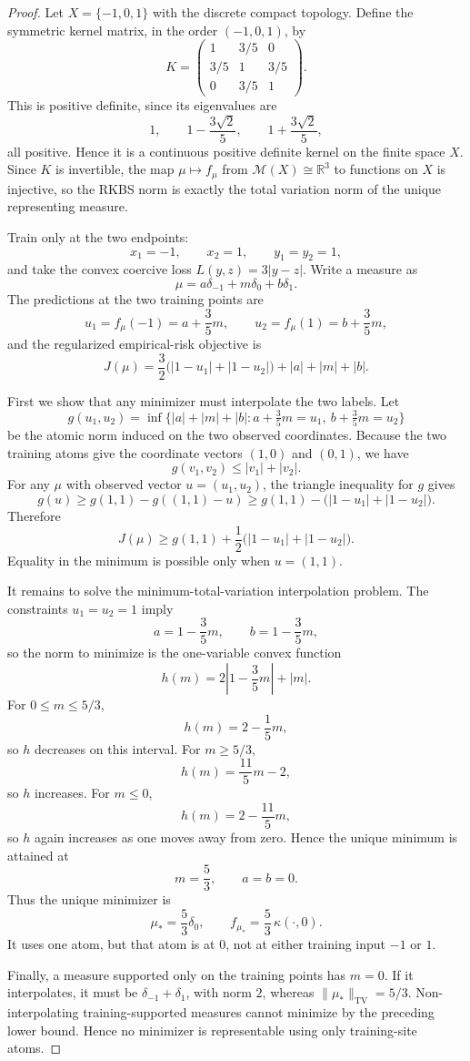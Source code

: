 \documentclass[11pt]{article}
\begin{document}
\begin{proof}
Let \(X=\{-1,0,1\}\) with the discrete compact topology.  Define the symmetric
kernel matrix, in the order \((-1,0,1)\), by
\[
K=
\begin{pmatrix}
1&3/5&0\\
3/5&1&3/5\\
0&3/5&1
\end{pmatrix}.
\]
This is positive definite, since its eigenvalues are
\[
1,\qquad 1-\frac{3\sqrt2}{5},\qquad 1+\frac{3\sqrt2}{5},
\]
all positive.  Hence it is a continuous positive definite kernel on the finite
space \(X\).  Since \(K\) is invertible, the map
\(\mu\mapsto f_\mu\) from \(\mathcal M(X)\cong\mathbb R^3\) to functions on
\(X\) is injective, so the RKBS norm is exactly the total variation norm of
the unique representing measure.

Train only at the two endpoints:
\[
x_1=-1,\qquad x_2=1,\qquad y_1=y_2=1,
\]
and take the convex coercive loss \(L(y,z)=3|y-z|\).  Write a measure as
\[
\mu=a\delta_{-1}+m\delta_0+b\delta_1.
\]
The predictions at the two training points are
\[
u_1=f_\mu(-1)=a+\frac35m,\qquad
u_2=f_\mu(1)=b+\frac35m,
\]
and the regularized empirical-risk objective is
\[
J(\mu)=\frac32\bigl(|1-u_1|+|1-u_2|\bigr)+|a|+|m|+|b|.
\]

First we show that any minimizer must interpolate the two labels.  Let
\[
g(u_1,u_2)=\inf\{|a|+|m|+|b|:
a+\tfrac35m=u_1,\ b+\tfrac35m=u_2\}
\]
be the atomic norm induced on the two observed coordinates.  Because the two
training atoms give the coordinate vectors \((1,0)\) and \((0,1)\), we have
\[
g(v_1,v_2)\le |v_1|+|v_2|.
\]
For any \(\mu\) with observed vector \(u=(u_1,u_2)\), the triangle inequality
for \(g\) gives
\[
g(u)\ge g(1,1)-g((1,1)-u)
\ge g(1,1)-\bigl(|1-u_1|+|1-u_2|\bigr).
\]
Therefore
\[
J(\mu)
\ge g(1,1)+\frac12\bigl(|1-u_1|+|1-u_2|\bigr).
\]
Equality in the minimum is possible only when \(u=(1,1)\).

It remains to solve the minimum-total-variation interpolation problem.  The
constraints \(u_1=u_2=1\) imply
\[
a=1-\frac35m,\qquad b=1-\frac35m,
\]
so the norm to minimize is the one-variable convex function
\[
h(m)=2\left|1-\frac35m\right|+|m|.
\]
For \(0\le m\le 5/3\),
\[
h(m)=2-\frac15m,
\]
so \(h\) decreases on this interval.  For \(m\ge 5/3\),
\[
h(m)=\frac{11}{5}m-2,
\]
so \(h\) increases.  For \(m\le0\),
\[
h(m)=2-\frac{11}{5}m,
\]
so \(h\) again increases as one moves away from zero.  Hence the unique
minimum is attained at
\[
m=\frac53,\qquad a=b=0.
\]
Thus the unique minimizer is
\[
\mu_\ast=\frac53\delta_0,\qquad
f_{\mu_\ast}=\frac53\,\kappa(\cdot,0).
\]
It uses one atom, but that atom is at \(0\), not at either training input
\(-1\) or \(1\).

Finally, a measure supported only on the training points has \(m=0\).  If it
interpolates, it must be \(\delta_{-1}+\delta_1\), with norm \(2\), whereas
\(\|\mu_\ast\|_{\mathrm{TV}}=5/3\).  Non-interpolating training-supported
measures cannot minimize by the preceding lower bound.  Hence no minimizer is
representable using only training-site atoms.
\end{proof}
\end{document}

